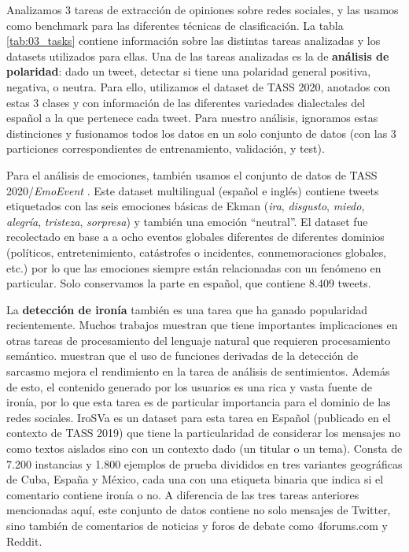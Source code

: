 Analizamos 3 tareas de extracción de opiniones sobre redes sociales, y las usamos como benchmark para las diferentes técnicas de clasificación. La tabla \ref{tab:03_tasks} contiene información sobre las distintas tareas analizadas y los datasets utilizados para ellas. Una de las tareas analizadas es la de \textbf{análisis de polaridad}: dado un tweet, detectar si tiene una polaridad general positiva, negativa, o neutra. Para ello, utilizamos el dataset de TASS 2020\cite{garcia2020overview}, anotados con estas 3 clases y con información de las diferentes variedades dialectales del español a la que pertenece cada tweet. Para nuestro análisis, ignoramos estas distinciones y fusionamos todos los datos en un solo conjunto de datos (con las 3 particiones correspondientes de entrenamiento, validación, y test).


Para el análisis de emociones, también usamos el conjunto de datos de TASS 2020/\emph{EmoEvent} \cite{plaza-del-arco-etal-2020-emoevent}. Este dataset multilingual (español e inglés) contiene tweets etiquetados con las seis emociones básicas de Ekman \cite{ekman1992argument} (\emph {ira}, \emph {disgusto}, \emph {miedo}, \emph {alegría}, \emph {tristeza}, \emph {sorpresa}) y también una emoción ``neutral''. El dataset fue recolectado en base a a ocho eventos globales diferentes de diferentes dominios (políticos, entretenimiento, catástrofes o incidentes, conmemoraciones globales, etc.) por lo que las emociones siempre están relacionadas con un fenómeno en particular. Solo conservamos la parte en español, que contiene 8.409 tweets.


 La \textbf{detección de ironía} también es una tarea que ha ganado popularidad recientemente. Muchos trabajos muestran que tiene importantes implicaciones en otras tareas de procesamiento del lenguaje natural que requieren procesamiento semántico. \citet{gupta-yang-2017-crystalnest} muestran que el uso de funciones derivadas de la detección de sarcasmo mejora el rendimiento en la tarea de análisis de sentimientos. Además de esto, el contenido generado por los usuarios es una rica y vasta fuente de ironía, por lo que esta tarea es de particular importancia para el dominio de las redes sociales. IroSVa \cite {ortega2019overview} es un dataset para esta tarea en Español (publicado en el contexto de TASS 2019) que tiene la particularidad de considerar los mensajes no como textos aislados sino con un contexto dado (un titular o un tema). Consta de 7.200 instancias y 1.800 ejemplos de prueba divididos en tres variantes geográficas de Cuba, España y México, cada una con una etiqueta binaria que indica si el comentario contiene ironía o no. A diferencia de las tres tareas anteriores mencionadas aquí, este conjunto de datos contiene no solo mensajes de Twitter, sino también de comentarios de noticias y foros de debate como 4forums.com y Reddit.

